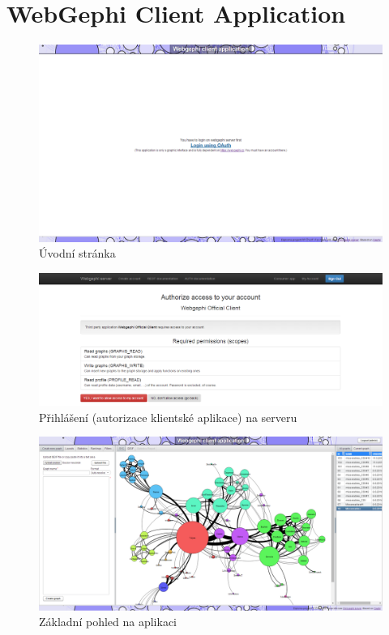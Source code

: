 \documentclass[thesis=M,czech]{FITthesis}[2014/05/6]
\begin{document}
\section{WebGephi Client Application}
\begin{figure}[!htb]\centering
 	\includegraphics[width=1\textwidth]{images/prtsc/clientapp-01-welcome}
 	\caption[Úvodní stránka]{Úvodní stránka}\label{fig:clientapp-01-welcome}
\end{figure}
\begin{figure}\centering
 	\includegraphics[width=1\textwidth]{images/prtsc/clientapp-02-app_auth_on_server}
 	\caption[Přihlášení na serveru]{Přihlášení (autorizace klientské aplikace) na serveru}\label{fig:clientapp-02-app_auth_on_server}
\end{figure}
\begin{figure}\centering
 	\includegraphics[width=1\textwidth]{images/prtsc/clientapp-03-overview}
 	\caption[Základní pohled na aplikaci]{Základní pohled na aplikaci}\label{fig:clientapp-03-overview}
\end{figure}
\end{document}
